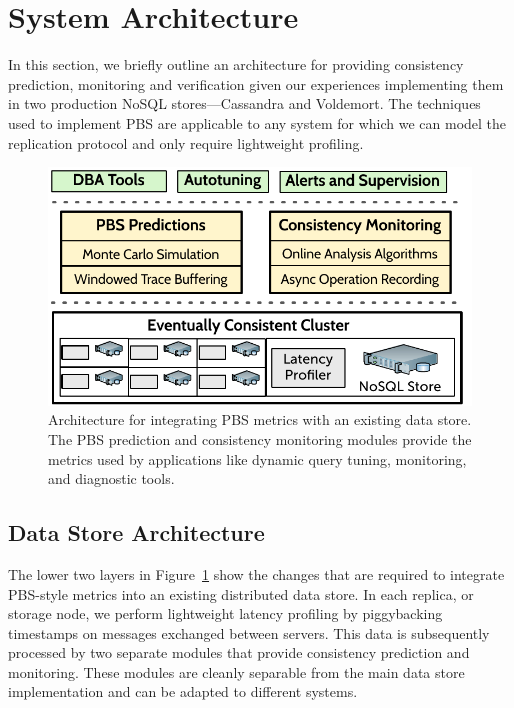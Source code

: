 \section{System Architecture}
\label{sec:architecture}

In this section, we briefly outline an architecture for providing
consistency prediction, monitoring and verification given our
experiences implementing them in two production NoSQL
stores---Cassandra and Voldemort. The techniques used to implement PBS
are applicable to any system for which we can model the replication
protocol and only require lightweight profiling.


\begin{figure}
\centering
\includegraphics[width=\columnwidth]{figs/cluster-arch.pdf}
\caption{Architecture for integrating PBS metrics with an existing
  data store. The PBS prediction and consistency monitoring modules
  provide the metrics used by applications like dynamic
  query tuning, monitoring, and diagnostic tools.}
\label{fig:pbs-sys-arch}
\end{figure}


\subsection{Data Store Architecture}
\label{sec:dbarch}

The lower two layers in Figure~\ref{fig:pbs-sys-arch} show the changes
that are required to integrate PBS-style metrics into an existing
distributed data store. In each replica, or storage node, we perform
lightweight latency profiling by piggybacking timestamps on messages
exchanged between servers. This data is subsequently processed by two
separate modules that provide consistency prediction and monitoring.
These modules are cleanly separable from the main data store
implementation and can be adapted to different systems.\\

